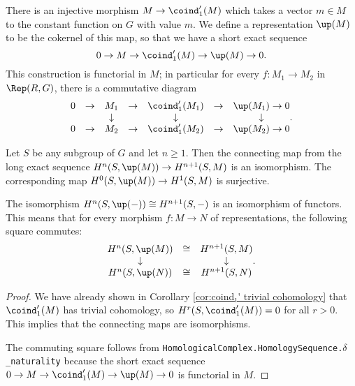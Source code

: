 \begin{definition} \label{def:up}
	\leanok
	There is an injective morphism $M \to \coind_1'(M)$ which takes a vector $m \in M$
	to the constant function on $G$ with value $m$.
	We define a representation $\up(M)$ to be the cokernel of this map, so that we have a short exact
	sequence
	\[
		0 \to M \to \coind_1'(M) \to \up(M) \to 0.
	\]
	This construction is functorial in $M$;
	in particular for every $f : M_1 \to M_2$ in $\Rep(R,G)$,
	there is a commutative diagram
	\[
		\begin{matrix}
			0 & \to & M_1 & \to & \coind_1'(M_1) & \to& \up(M_1) \to 0 \\
			&&\downarrow &&\downarrow&&\downarrow \\
			0 & \to & M_2 & \to & \coind_1'(M_2) & \to& \up(M_2) \to 0 \\
		\end{matrix}.
	\]
\end{definition}

\begin{corollary}	\label{cor:up iso}
	\leanok
	Let $S$ be any subgroup of $G$ and let $n \ge 1$.
	Then the connecting map from the long exact sequence $H^{n}(S,\up(M)) \to H^{n+1}(S,M)$ is an
	isomorphism.
	The corresponding map $H^{0}(S,\up(M)) \to H^{1}(S,M)$ is	surjective.

	The isomorphism $H^{n}(S,\up(-)) \cong H^{n+1}(S,-)$ is an isomorphism of functors.
	This means that for every morphism $f : M \to N$ of representations,
	the following square commutes:
	\[
		\begin{matrix}
			H^{n}(S,\up(M)) & \cong & H^{n+1}(S,M) \\
			\downarrow && \downarrow \\
			H^{n}(S,\up(N)) & \cong & H^{n+1}(S,N)
		\end{matrix}.
	\]
\end{corollary}

\begin{proof}
	\leanok
	We have already shown in Corollary \ref{cor:coind₁' trivial cohomology}
	that $\coind_1'(M)$ has trivial cohomology, so $H^{r}(S,\coind_1'(M))=0$
	for all $r>0$. This implies that the connecting maps are isomorphisms.

	The commuting square follows from
	\texttt{HomologicalComplex.HomologySequence.$\delta$\_naturality}
	because the short exact sequence $0 \to M \to \coind_1'(M) \to \up(M) \to 0$
	is functorial in $M$.
\end{proof}


